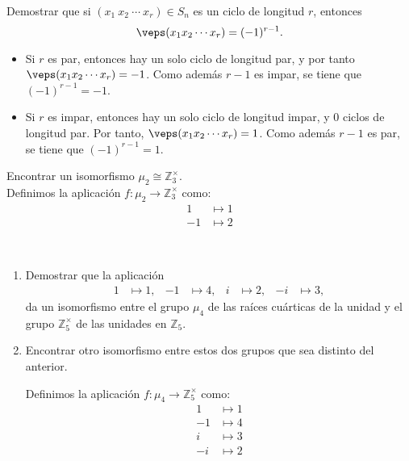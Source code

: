 \begin{ejercicio}\label{ej:2.24}
    Demostrar que si $(x_1\ x_2\ \cdots\ x_r) \in S_n$ es un ciclo de longitud $r$, entonces
    $$\veps(x_1x_2 \cdots x_r) = (-1)^{r - 1}.$$

    \begin{itemize}
        \item Si $r$ es par, entonces hay un solo ciclo de longitud par, y por tanto $\veps(x_1x_2 \cdots x_r) = -1$. Como además $r-1$ es impar, se tiene que $(-1)^{r-1}=-1$.
        
        \item Si $r$ es impar, entonces hay un solo ciclo de longitud impar, y 0 ciclos de longitud par. Por tanto, $\veps(x_1x_2 \cdots x_r) = 1$. Como además $r-1$ es par, se tiene que $(-1)^{r-1}=1$.
    \end{itemize}
\end{ejercicio}

\begin{ejercicio}\label{ej:2.25}
    Encontrar un isomorfismo $\mu_2 \cong \mathbb{Z}^{\times}_3$.\\

    Definimos la aplicación $f:\mu_2\to \mathbb{Z}^{\times}_3$ como:
    \begin{align*}
        1 &\mapsto 1\\
        -1 &\mapsto 2
    \end{align*}
\end{ejercicio}

\begin{ejercicio}\label{ej:2.26}~
    \begin{enumerate}
        \item Demostrar que la aplicación
        \begin{align*}
            1 &\mapsto 1, & -1 &\mapsto 4, & i &\mapsto 2, & -i &\mapsto 3,
        \end{align*}
        da un isomorfismo entre el grupo $\mu_4$ de las raíces cuárticas de la unidad y el grupo $\mathbb{Z}^{\times}_5$ de las unidades en $\mathbb{Z}_5$.
        \item Encontrar otro isomorfismo entre estos dos grupos que sea distinto del anterior.
        
        Definimos la aplicación $f:\mu_4\to \mathbb{Z}^{\times}_5$ como:
        \begin{align*}
            1 &\mapsto 1\\
            -1 &\mapsto 4\\
            i &\mapsto 3\\
            -i &\mapsto 2
        \end{align*}
    \end{enumerate}
\end{ejercicio}

